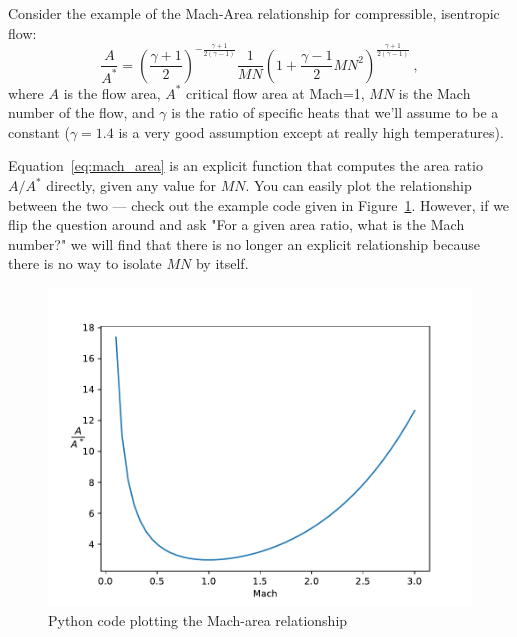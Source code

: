 \documentclass[conf]{new-aiaa}
\begin{document}
    Consider the example of the Mach-Area relationship for compressible, isentropic flow: 
    \begin{equation}
        \frac{A}{A^*} = \left(\frac{\gamma+1}{2}\right)^{-\frac{\gamma+1}{2(\gamma-1)}} 
                        \frac{1}{MN} 
                        \left( 1 + \frac{\gamma-1}{2}MN^2 \right)^{\frac{\gamma+1}{2(\gamma-1)}} \ ,
                        \label{eq:mach_area}
    \end{equation}
    where $A$ is the flow area, $A^*$ critical flow area at Mach=1, $MN$ is the Mach number of the flow, and $\gamma$ is the ratio of specific heats that we'll assume to be a constant ($\gamma=1.4$ is a very good assumption except at really high temperatures).

    Equation~\eqref{eq:mach_area} is an explicit function that computes the area ratio $A/A^*$ directly, given any value for $MN$. 
    You can easily plot the relationship between the two --- check out the example code given in Figure~\ref{fig:mach-area}. 
    However, if we flip the question around and ask "For a given area ratio, what is the Mach number?" we will find that there is no longer an explicit relationship because there is no way to isolate $MN$ by itself. 
    \begin{figure}[H]
        \centering
        
        \includegraphics[width=.75\textwidth]{mach_area.pdf}
        \caption{Python code plotting the Mach-area relationship}
        \label{fig:mach-area}
    \end{figure}
\end{document}
